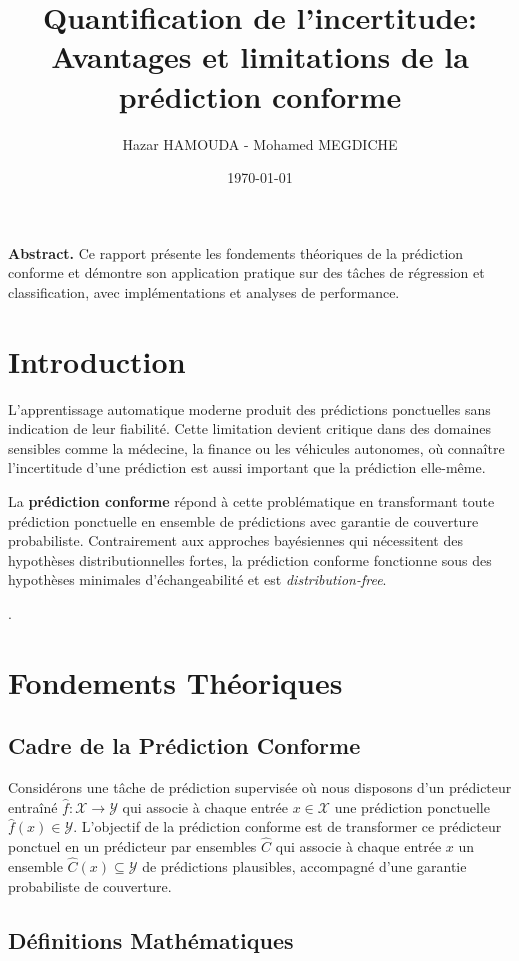 \documentclass[a4paper,12pt]{article}
\title{\textbf{Quantification de l'incertitude:\\ Avantages et limitations de la prédiction conforme}}
\author{Hazar HAMOUDA - Mohamed MEGDICHE}
\date{\today}
\begin{document}
\maketitle
\textbf{Abstract. }
Ce rapport présente les fondements théoriques de la prédiction conforme et démontre son application pratique sur des tâches de régression et classification, avec implémentations et analyses de performance.


\section{Introduction}

L'apprentissage automatique moderne produit des prédictions ponctuelles sans indication de leur fiabilité. Cette limitation devient critique dans des domaines sensibles comme la médecine, la finance ou les véhicules autonomes, où connaître l'incertitude d'une prédiction est aussi important que la prédiction elle-même.

La \textbf{prédiction conforme} répond à cette problématique en transformant toute prédiction ponctuelle en ensemble de prédictions avec garantie de couverture probabiliste. Contrairement aux approches bayésiennes qui nécessitent des hypothèses distributionnelles fortes, la prédiction conforme fonctionne sous des hypothèses minimales d'échangeabilité et est \textit{distribution-free}.

.

\section{Fondements Théoriques}


\subsection{Cadre de la Prédiction Conforme}
Considérons une tâche de prédiction supervisée où nous disposons d'un prédicteur entraîné $\hat{f} : \mathcal{X} \rightarrow \mathcal{Y}$ qui associe à chaque entrée $x \in \mathcal{X}$ une prédiction ponctuelle $\hat{f}(x) \in \mathcal{Y}$. L'objectif de la prédiction conforme est de transformer ce prédicteur ponctuel en un prédicteur par ensembles $\hat{C}$ qui associe à chaque entrée $x$ un ensemble $\hat{C}(x) \subseteq \mathcal{Y}$ de prédictions plausibles, accompagné d'une garantie probabiliste de couverture.



\subsection{Définitions Mathématiques}
\end{document}
